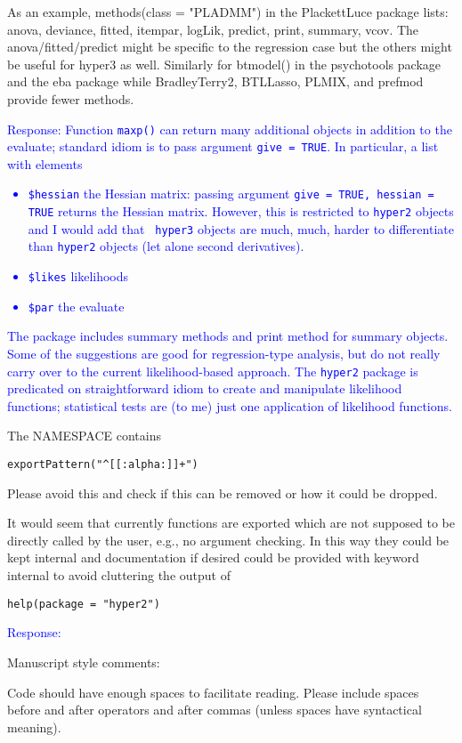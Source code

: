 \documentclass[12pt]{article}
\begin{document}
As an example, methods(class = "PLADMM") in the PlackettLuce package
lists: anova, deviance, fitted, itempar, logLik, predict, print,
summary, vcov. The anova/fitted/predict might be specific to the
regression case but the others might be useful for hyper3 as
well. Similarly for btmodel() in the psychotools package and the eba
package while BradleyTerry2, BTLLasso, PLMIX, and prefmod provide
fewer methods.

\textcolor{blue}{Response: Function {\tt maxp()} can return many
  additional objects in addition to the evaluate; standard idiom is to
  pass argument {\tt give = TRUE}.  In particular, a list with
  elements
  \begin{itemize}
  \item {\tt \$hessian} the Hessian matrix: passing argument {\tt give
    = TRUE, hessian = TRUE} returns the Hessian matrix.  However, this
    is restricted to {\tt hyper2} objects and I would add that {\tt
      hyper3} objects are much, much, harder to differentiate than
    {\tt hyper2} objects (let alone second derivatives).
    \item {\tt \$likes} likelihoods
    \item {\tt \$par} the evaluate
  \end{itemize}
  The package includes summary methods and print method for summary
  objects.\\ Some of the suggestions are good for regression-type
  analysis, but do not really carry over to the current
  likelihood-based approach.  The {\tt hyper2} package is predicated
  on straightforward idiom to create and manipulate likelihood
  functions; statistical tests are (to me) just one application of
  likelihood functions.}

The NAMESPACE contains

\verb=exportPattern("^[[:alpha:]]+")=

Please avoid this and check if this can be removed or how it could be
dropped.

It would seem that currently functions are exported which are not
supposed to be directly called by the user, e.g., no argument
checking. In this way they could be kept internal and documentation if
desired could be provided with keyword internal to avoid cluttering
the output of

\verb+help(package = "hyper2")+

\textcolor{blue}{Response:}

Manuscript style comments:

Code should have enough spaces to facilitate reading.  Please include
spaces before and after operators and after commas (unless spaces have
syntactical meaning).
\end{document}
